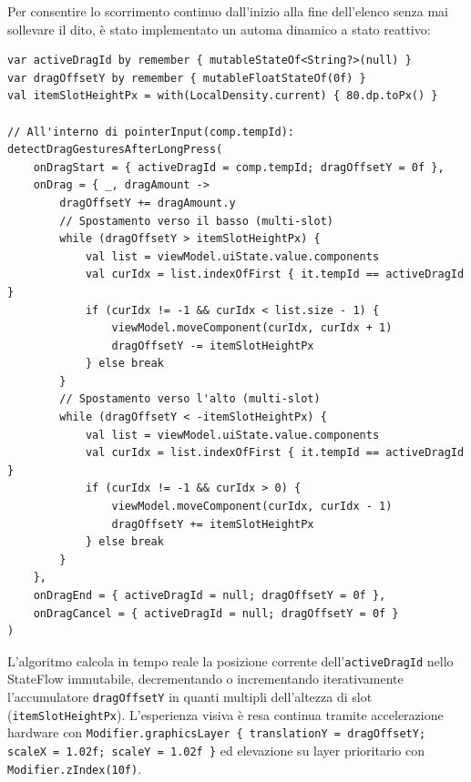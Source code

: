 \documentclass[11pt,a4paper,titlepage]{article}
\begin{document}
Per consentire lo scorrimento continuo dall'inizio alla fine dell'elenco senza mai sollevare il dito, \`e stato implementato un automa dinamico a stato reattivo:
\begin{lstlisting}[caption={Algoritmo continuo multi-slot basato su ID dinamico e loop iterativo}]
var activeDragId by remember { mutableStateOf<String?>(null) }
var dragOffsetY by remember { mutableFloatStateOf(0f) }
val itemSlotHeightPx = with(LocalDensity.current) { 80.dp.toPx() }

// All'interno di pointerInput(comp.tempId):
detectDragGesturesAfterLongPress(
    onDragStart = { activeDragId = comp.tempId; dragOffsetY = 0f },
    onDrag = { _, dragAmount ->
        dragOffsetY += dragAmount.y
        // Spostamento verso il basso (multi-slot)
        while (dragOffsetY > itemSlotHeightPx) {
            val list = viewModel.uiState.value.components
            val curIdx = list.indexOfFirst { it.tempId == activeDragId }
            if (curIdx != -1 && curIdx < list.size - 1) {
                viewModel.moveComponent(curIdx, curIdx + 1)
                dragOffsetY -= itemSlotHeightPx
            } else break
        }
        // Spostamento verso l'alto (multi-slot)
        while (dragOffsetY < -itemSlotHeightPx) {
            val list = viewModel.uiState.value.components
            val curIdx = list.indexOfFirst { it.tempId == activeDragId }
            if (curIdx != -1 && curIdx > 0) {
                viewModel.moveComponent(curIdx, curIdx - 1)
                dragOffsetY += itemSlotHeightPx
            } else break
        }
    },
    onDragEnd = { activeDragId = null; dragOffsetY = 0f },
    onDragCancel = { activeDragId = null; dragOffsetY = 0f }
)
\end{lstlisting}

L'algoritmo calcola in tempo reale la posizione corrente dell'\texttt{activeDragId} nello StateFlow immutabile, decrementando o incrementando iterativamente l'accumulatore \texttt{dragOffsetY} in quanti multipli dell'altezza di slot (\texttt{itemSlotHeightPx}). L'esperienza visiva \`e resa continua tramite accelerazione hardware con \texttt{Modifier.graphicsLayer \{ translationY = dragOffsetY; scaleX = 1.02f; scaleY = 1.02f \}} ed elevazione su layer prioritario con \texttt{Modifier.zIndex(10f)}.

\newpage

\end{document}
